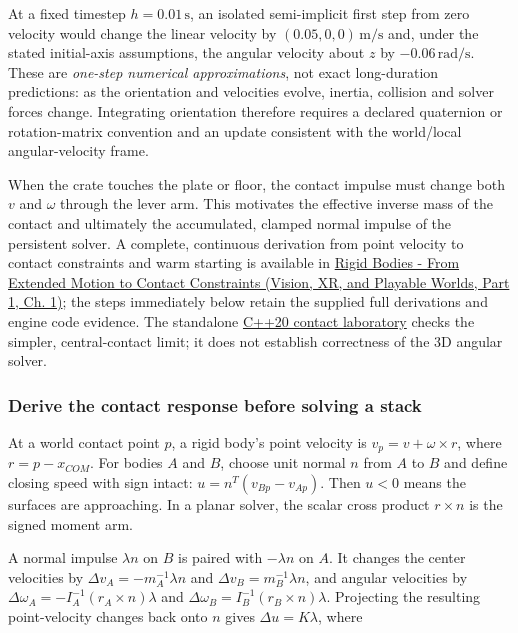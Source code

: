 At a fixed timestep \(h=0.01\,\mathrm s\), an isolated semi-implicit first step from zero velocity would change the linear velocity by \((0.05,0,0)\,\mathrm{m/s}\) and, under the stated initial-axis assumptions, the angular velocity about \(z\) by \(-0.06\,\mathrm{rad/s}\). These are \emph{one-step numerical approximations}, not exact long-duration predictions: as the orientation and velocities evolve, inertia, collision and solver forces change. Integrating orientation therefore requires a declared quaternion or rotation-matrix convention and an update consistent with the world/local angular-velocity frame.

When the crate touches the plate or floor, the contact impulse must change both \(v\) and \(\omega\) through the lever arm. This motivates the effective inverse mass of the contact and ultimately the accumulated, clamped normal impulse of the persistent solver. A complete, continuous derivation from point velocity to contact constraints and warm starting is available in \href{../07-Vision-XR-and-Playable-Worlds-P01/main.pdf\#nameddest=02-foundations-ii-ch039-physical-foundations-rigid-bodies-extended-motion-and-contact-constraints}{Rigid Bodies - From Extended Motion to Contact Constraints (Vision, XR, and Playable Worlds, Part 1, Ch. 1)}; the steps immediately below retain the supplied full derivations and engine code evidence. The standalone \hyperref[source-file-128143bcbfc7213e97eaefa4]{C++20 contact laboratory} checks the simpler, central-contact limit; it does not establish correctness of the 3D angular solver.

\subsubsection{Derive the contact response before solving a stack}\label{06-engine-ii-ch034-derive-the-contact-response-before-solving-a-stack}

\hypertarget{06-engine-ii-ch034-derive-the-contact-response-before-solving-a-stack}{}

At a world contact point \(p\), a rigid body's point velocity is \(v_p=v+\omega\times r\), where \(r=p-x_{COM}\). For bodies \(A\) and \(B\), choose unit normal \(n\) from \(A\) to \(B\) and define closing speed with sign intact: \(u=n^T(v_{Bp}-v_{Ap})\). Then \(u<0\) means the surfaces are approaching. In a planar solver, the scalar cross product \(r\times n\) is the signed moment arm.

A normal impulse \(\lambda n\) on \(B\) is paired with \(-\lambda n\) on \(A\). It changes the center velocities by \(\Delta v_A=-m_A^{-1}\lambda n\) and \(\Delta v_B=m_B^{-1}\lambda n\), and angular velocities by \(\Delta\omega_A=-I_A^{-1}(r_A\times n)\lambda\) and \(\Delta\omega_B=I_B^{-1}(r_B\times n)\lambda\). Projecting the resulting point-velocity changes back onto \(n\) gives \(\Delta u=K\lambda\), where

